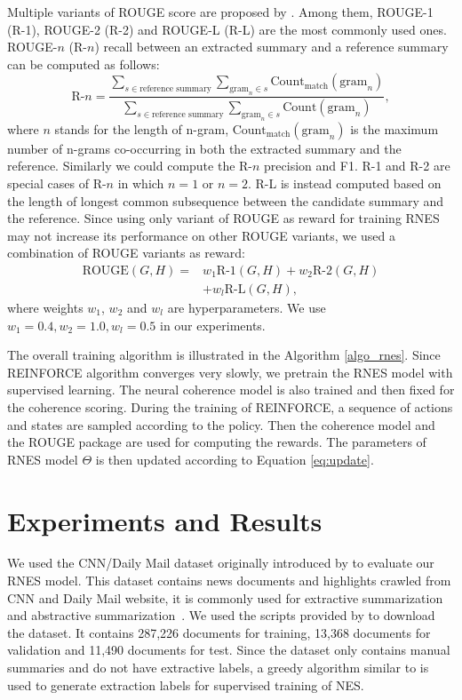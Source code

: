 \documentclass[letterpaper]{article} %
\begin{document}
	Multiple variants of ROUGE score are proposed by \cite{rouge}. Among them, ROUGE-1 (R-1), ROUGE-2 (R-2) and ROUGE-L (R-L) are the most commonly used ones. ROUGE-$n$ (R-$n$) recall between an extracted summary and a reference summary can be computed as follows:
	\[ \text{R-}n = \frac{\sum_{s\in\text{reference summary}} \sum_{\text{gram}_n \in s} \text{Count}_{\text{match}} (\text{gram}_n) }{\sum_{s\in\text{reference summary}} \sum_{\text{gram}_n \in s} \text{Count} (\text{gram}_n)} , \]
	where $n$ stands for the length of n-gram, $\text{Count}_{\text{match}} (\text{gram}_n)$ is the maximum number of n-grams co-occurring in both the extracted summary and the reference. Similarly we could compute the R-$n$ precision and F1. R-1 and R-2 are special cases of R-$n$ in which $n=1$ or $n=2$. R-L is instead computed based on the length of longest common subsequence between the candidate summary and the reference. Since using only variant of ROUGE as reward for training RNES may not increase its performance on other ROUGE variants, we used a combination of ROUGE variants as reward:
	\begin{align*}
	\text{ROUGE}(G, H) = & w_1 \text{R-1}(G, H) + w_2 \text{R-2}(G, H) \\
	& + w_l \text{R-L}(G, H),
	\end{align*}
	where weights $w_1$, $w_2$ and $w_l$ are hyperparameters. We use $w_1=0.4, w_2=1.0, w_l=0.5$ in our experiments.

	The overall training algorithm is illustrated in the Algorithm \ref{algo_rnes}. Since REINFORCE algorithm converges very slowly, we pretrain the RNES model with supervised learning. The neural coherence model is also trained and then fixed for the coherence scoring. During the training of REINFORCE, a sequence of actions and states are sampled according to the policy. Then the coherence model and the ROUGE package are used for computing the rewards. The parameters of RNES model $\Theta$ is then updated according to Equation \ref{eq:update}. 
	
	
	\section{Experiments and Results}

	We used the CNN/Daily Mail dataset originally introduced by \cite{hermann_teaching_2015} to evaluate our RNES model. This dataset contains news documents and highlights crawled from CNN and Daily Mail website, it is commonly used for extractive summarization~\cite{jianpeng2016,SummaRuNNer} and abstractive summarization~\cite{nallapati_ramesh_abstractive_2016,see_get_2017}. We used the scripts provided by \cite{hermann_teaching_2015} to download the dataset. It contains 287,226 documents for training, 13,368 documents for validation and 11,490 documents for test. Since the dataset only contains manual summaries and do not have extractive labels, a greedy algorithm similar to \cite{SummaRuNNer} is used to generate extraction labels for supervised training of NES.
	 
\end{document}
